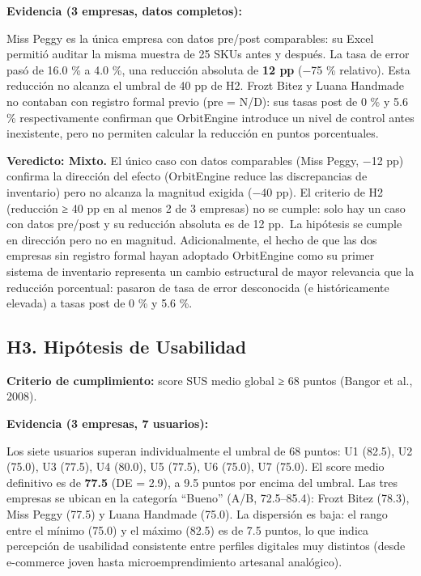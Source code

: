 \textbf{Evidencia (3 empresas, datos completos):}

Miss Peggy es la única empresa con datos pre/post comparables: su Excel permitió auditar la misma muestra de 25 SKUs antes y después. La tasa de error pasó de 16.0 \% a 4.0 \%, una reducción absoluta de \textbf{12 pp} (−75 \% relativo). Esta reducción no alcanza el umbral de 40 pp de H2. Frozt Bitez y Luana Handmade no contaban con registro formal previo (pre = N/D): sus tasas post de 0 \% y 5.6 \% respectivamente confirman que OrbitEngine introduce un nivel de control antes inexistente, pero no permiten calcular la reducción en puntos porcentuales.

\textbf{Veredicto: Mixto.} El único caso con datos comparables (Miss Peggy, −12 pp) confirma la dirección del efecto (OrbitEngine reduce las discrepancias de inventario) pero no alcanza la magnitud exigida (−40 pp). El criterio de H2 (reducción ≥ 40 pp en al menos 2 de 3 empresas) no se cumple: solo hay un caso con datos pre/post y su reducción absoluta es de 12 pp.~La hipótesis se cumple en dirección pero no en magnitud. Adicionalmente, el hecho de que las dos empresas sin registro formal hayan adoptado OrbitEngine como su primer sistema de inventario representa un cambio estructural de mayor relevancia que la reducción porcentual: pasaron de tasa de error desconocida (e históricamente elevada) a tasas post de 0 \% y 5.6 \%.

\subsection{H3. Hipótesis de Usabilidad}\label{h3.-hipuxf3tesis-de-usabilidad}

\textbf{Criterio de cumplimiento:} score SUS medio global ≥ 68 puntos (Bangor et al., 2008).

\textbf{Evidencia (3 empresas, 7 usuarios):}

Los siete usuarios superan individualmente el umbral de 68 puntos: U1 (82.5), U2 (75.0), U3 (77.5), U4 (80.0), U5 (77.5), U6 (75.0), U7 (75.0). El score medio definitivo es de \textbf{77.5} (DE = 2.9), a 9.5 puntos por encima del umbral. Las tres empresas se ubican en la categoría ``Bueno'' (A/B, 72.5--85.4): Frozt Bitez (78.3), Miss Peggy (77.5) y Luana Handmade (75.0). La dispersión es baja: el rango entre el mínimo (75.0) y el máximo (82.5) es de 7.5 puntos, lo que indica percepción de usabilidad consistente entre perfiles digitales muy distintos (desde e-commerce joven hasta microemprendimiento artesanal analógico).

